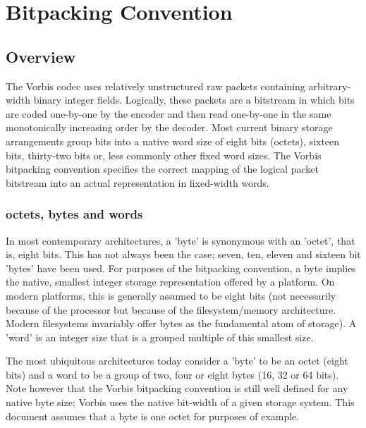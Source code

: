 \section{Bitpacking Convention} \label{vorbis:spec:bitpacking}

\subsection{Overview}

The Vorbis codec uses relatively unstructured raw packets containing
arbitrary-width binary integer fields.  Logically, these packets are a
bitstream in which bits are coded one-by-one by the encoder and then
read one-by-one in the same monotonically increasing order by the
decoder.  Most current binary storage arrangements group bits into a
native word size of eight bits (octets), sixteen bits, thirty-two bits
or, less commonly other fixed word sizes.  The Vorbis bitpacking
convention specifies the correct mapping of the logical packet
bitstream into an actual representation in fixed-width words.


\subsubsection{octets, bytes and words}

In most contemporary architectures, a 'byte' is synonymous with an
'octet', that is, eight bits.  This has not always been the case;
seven, ten, eleven and sixteen bit 'bytes' have been used.  For
purposes of the bitpacking convention, a byte implies the native,
smallest integer storage representation offered by a platform.  On
modern platforms, this is generally assumed to be eight bits (not
necessarily because of the processor but because of the
filesystem/memory architecture.  Modern filesystems invariably offer
bytes as the fundamental atom of storage).  A 'word' is an integer
size that is a grouped multiple of this smallest size.

The most ubiquitous architectures today consider a 'byte' to be an
octet (eight bits) and a word to be a group of two, four or eight
bytes (16, 32 or 64 bits).  Note however that the Vorbis bitpacking
convention is still well defined for any native byte size; Vorbis uses
the native bit-width of a given storage system. This document assumes
that a byte is one octet for purposes of example.

